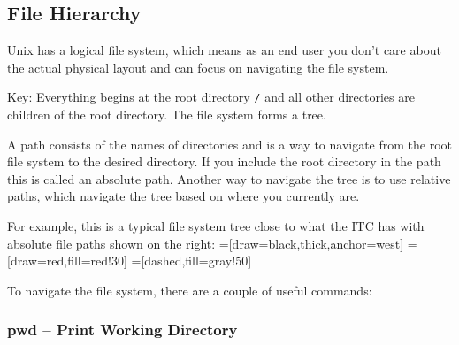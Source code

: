 \documentclass[11pt]{cselabheader}
\begin{document}
\subsection{File Hierarchy}

Unix has a logical file system, which means as an end user you don't care about
the actual physical layout and can focus on navigating the file system.

Key: Everything begins at the root directory
\texttt{/} and all other directories are children of the root directory. The
file system forms a tree.

A path consists of the names of directories and is a way to navigate from the
root file system to the desired directory. If you include the root directory in
the path this is called an absolute path. Another way to navigate the tree is to
use relative paths, which navigate the tree based on where you currently are.

For example, this is a typical file system tree close to what the ITC has with
absolute file paths shown on the right:
=[draw=black,thick,anchor=west]
=[draw=red,fill=red!30]
=[dashed,fill=gray!50]


To navigate the file system, there are a couple of useful commands:

\subsubsection{pwd -- \textbf{P}rint \textbf{W}orking \textbf{D}irectory}
\end{document}
